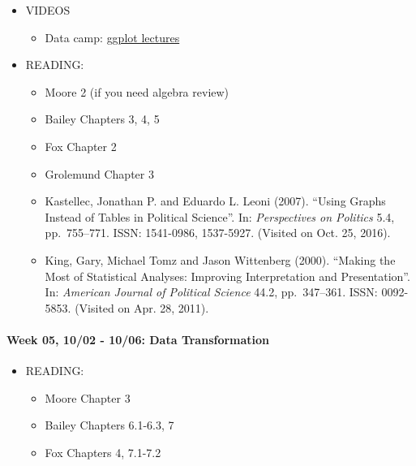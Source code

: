 \documentclass[11pt,]{article}
\providecommand{\tightlist}{%
  \setlength{\itemsep}{0pt}\setlength{\parskip}{0pt}}
\begin{document}
\begin{itemize}
\tightlist
\item
  VIDEOS

  \begin{itemize}
  \tightlist
  \item
    Data camp:
    \href{https://www.datacamp.com/courses/data-visualization-with-ggplot2-1}{ggplot
    lectures}
  \end{itemize}
\item
  READING:

  \begin{itemize}
  \item
    Moore 2 (if you need algebra review)
  \item
    Bailey Chapters 3, 4, 5
  \item
    Fox Chapter 2
  \item
    Grolemund Chapter 3
  \item
     Kastellec, Jonathan P. and Eduardo L. Leoni
    (2007). ``Using Graphs Instead of Tables in Political Science''. In:
    \emph{Perspectives on Politics} 5.4, pp.~755--771. ISSN: 1541-0986,
    1537-5927. (Visited on Oct. 25, 2016).
  \item
     King, Gary, Michael Tomz and Jason Wittenberg
    (2000). ``Making the Most of Statistical Analyses: Improving
    Interpretation and Presentation''. In:
    \emph{American Journal of Political Science} 44.2, pp.~347--361.
    ISSN: 0092-5853. (Visited on Apr. 28, 2011).
  \end{itemize}
\end{itemize}

\paragraph{Week 05, 10/02 - 10/06: Data
Transformation}\label{week-05-1002---1006-data-transformation}

\begin{itemize}
\tightlist
\item
  READING:

  \begin{itemize}
  \tightlist
  \item
    Moore Chapter 3
  \item
    Bailey Chapters 6.1-6.3, 7
  \item
    Fox Chapters 4, 7.1-7.2
  \end{itemize}
\end{itemize}
\end{document}
